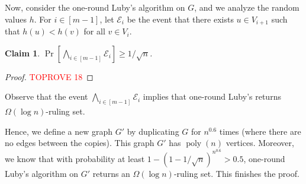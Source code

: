 \documentclass[11pt,letterpaper]{article}
\theoremstyle{plain}
\newtheorem*{claim*}{Claim}
\theoremstyle{definition}
\theoremstyle{remark}
\DeclareMathOperator{\poly}{poly}
\begin{document}
Now, consider the one-round Luby's algorithm on $G$,
and we analyze the random values $h$.
For $i \in [m - 1]$, let $\mathcal{E}_i$ be the event that there exists $u \in V_{i + 1}$ such that
$h(u) < h(v)$ for all $v \in V_{i}$.

\begin{claim*}
    $\Pr[\bigwedge_{i \in [m-1]} \mathcal{E}_i] \geq 1 / \sqrt{n}$.
\end{claim*}
\begin{proof}\textcolor{red}{TOPROVE 18}\end{proof}
Observe that the event $\bigwedge_{i \in [m-1]} \mathcal{E}_{i}$ implies that one-round Luby's returns $\Omega(\log n)$-ruling set.

Hence, we define a new graph $G'$ by duplicating $G$ for $n^{0.6}$ times (where there are no edges between the copies).
This graph $G'$ has $\poly(n)$ vertices.
Moreover, we know that with probability at least $1 - (1 - 1 / \sqrt{n})^{n^{0.6}} > 0.5$,
one-round Luby's algorithm on $G'$ returns an $\Omega(\log n)$-ruling set.
This finishes the proof.


     
\end{document}
